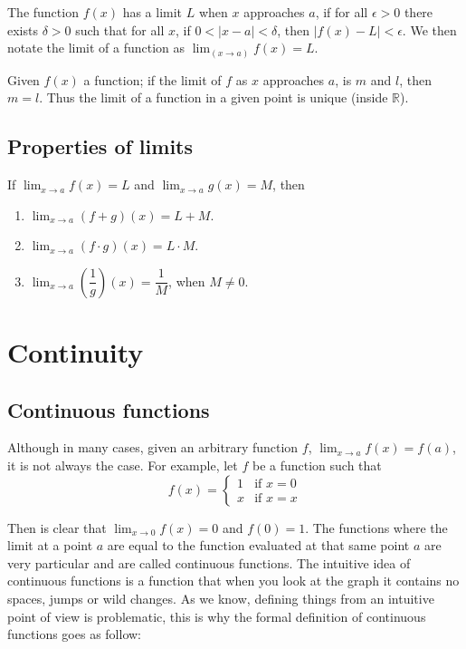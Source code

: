 \documentclass{report}
\begin{document}
\begin{defBox}
    The function $f(x)$ has a limit $L$ when $x$ approaches $a$, if for all $\epsilon > 0$ there exists $\delta > 0$ such that for all $x$, if $0 < |x-a| <\delta$, then $|f(x)-L| < \epsilon$. We then notate the limit of a function as $\lim_(x \to a) f(x) = L$.
\end{defBox}

\begin{thBox}
    Given $f(x)$ a function; if the limit of $f$ as $x$ approaches $a$, is $m$ and $l$, then $m=l$. Thus the limit of a function in a given point is unique (inside $\mathbb{R}$).
\end{thBox}

\section{Properties of limits}

\begin{thBox}
    If $\lim_{x \to a} f(x) = L$ and $\lim_{x \to a} g(x) = M$, then

    \begin{enumerate}
        \item $\lim_{x \to a} (f + g)(x) = L + M$.
        \item $\lim_{x \to a} (f \cdot g)(x) = L \cdot M$.
        \item $\lim_{x \to a} (\dfrac{1}{g})(x) = \dfrac{1}{M}$, when $M \not = 0$.
    \end{enumerate}
\end{thBox}

\chapter{Continuity}

\section{Continuous functions}

Although in many cases, given an arbitrary function $f$, $\lim_{x \to a} f(x) = f(a)$, it is not always the case. For example, let $f$ be a function such that
$$f(x) = \begin{cases}
        1 & \text{if } x =0 \\
        x & \text{if } x=x
    \end{cases}$$

Then is clear that $\lim_{x \to 0} f(x) = 0$ and $f(0) = 1$. The functions where the limit at a point $a$ are equal to the function evaluated at that same point $a$ are very particular and are called continuous functions. The intuitive idea of continuous functions is a function that when you look at the graph it contains no spaces, jumps or wild changes. As we know, defining things from an intuitive point of view is problematic, this is why the formal definition of continuous functions goes as follow:\\
\end{document}
